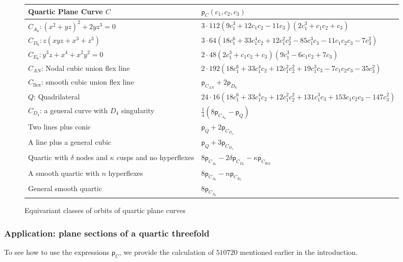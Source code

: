 \documentclass[12 pt, reqno]{amsart}
\theoremstyle{definition}
\newcommand{\on}{\operatorname}
\newcommand{\p}{\mathsf{p}}
\begin{document}
\begin{figure}[p]
\begin{longtable}{p{6.5cm} | p{9cm}}
  Quartic Plane Curve $C$ & $\p_C(c_1,c_2,c_3)$\\\hline
  $C_{A_6}: (x^2 + yz)^2 + 2yz^3 = 0$ & 
                                        $ 3\cdot112 (9 c_1^3 + 12 c_1 c_2 - 11 c_3) (2 c_1^3 + c_1 c_2 + c_3)$\\
  $C_{D_6}: z(xyz + x^{3} + z^{3})$ &$3\cdot 64 (18 c_1^6 + 33 c_1^4 c_2 + 12 c_1^2 c_2^2 - 85 c_1^3 c_3 - 11 c_1 c_2 c_3 - 7 c_3^2)$\\
  $C_{E_6}: y^3z + x^4 + x^2y^2 = 0$ &
                                       $2\cdot 48 (2 c_1^3 + c_1 c_2 + c_3) (9 c_1^3 - 6 c_1 c_2 + 7 c_3)$\\
  $C_{AN}$: Nodal cubic union flex line & $2\cdot 192 (18 c_1^6 + 33 c_1^4 c_2 + 12 c_1^2 c_2^2 + 19 c_1^3 c_3 - 7 c_1 c_2 c_3 - 
                                          35 c_3^2)$\\
  $C_{\on{flex}}$: smooth cubic union flex line & $\p_{C_{AN}}+2\p_{D_6}$\\
  $Q$: Quadrilateral &  
                       $24\cdot 16 (18 c_1^6 + 33 c_1^4 c_2 + 12 c_1^2 c_2^2 + 131 c_1^3 c_3 + 
                       153 c_1 c_2 c_3 - 147 c_3^2)$\\
  $C_{D_{4}}$: a general curve with $D_4$ singularity & 
                                                        $\frac{1}{4}(8\p_{C_{A_{6}}} - \p_{Q})$
  \\
  Two lines plus conic & $\p_{Q} + 2\p_{C_{D_{4}}}$\\
  A line plus a general cubic & 
                                $\p_{Q} + 3\p_{C_{D_{4}}}$
  \\
  Quartic with $\delta$ nodes and $\kappa$ cusps and no hyperflexes& $8\p_{C_{A_{6}}}-2\delta \p_{C_{D_6}}-\kappa \p_{C_{\on{flex}}}$\\
  A smooth quartic with $n$ hyperflexes &  $8\p_{C_{A_{6}}}-n\p_{C_{E_6}}$\\
  General smooth quartic & $8\p_{C_{A_{6}}}$
\end{longtable}
\caption{Equivariant classes of orbits of quartic plane curves}
\label{quartictable}
\end{figure}

\subsubsection{Application: plane sections of a quartic threefold}
To see how to use the expressions $\p_C$, we provide the calculation
of $510720$ mentioned earlier in the introduction.
\end{document}
